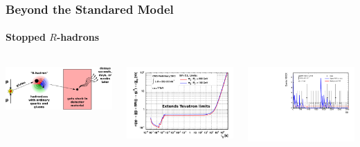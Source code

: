 \documentclass[compress]{beamer}
\begin{document}
\begin{frame}
\frametitle{Beyond the Standared Model}
\framesubtitle{Stopped $R$-hadrons}
\begin{columns}
\includegraphics[width=\linewidth]{stoppedgluino.pdf}

\vspace{0.5 cm}
\includegraphics[width=\linewidth]{stoppedgluino_limits.pdf}

\vspace{-0.25 cm}
\includegraphics[width=\linewidth]{stoppedgluino_observedevents.pdf}


\end{columns}
\end{frame}
\end{document}
